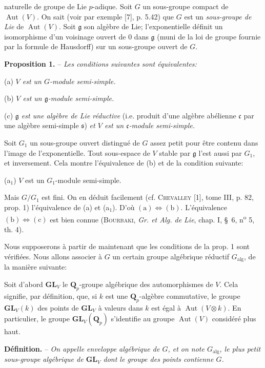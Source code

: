 naturelle de groupe de Lie $p$-adique. Soit $G$ un sous-groupe compact de $\operatorname{Aut}(V)$. On sait (voir par exemple [7], p. 5.42) que $G$ est un \textit{sous-groupe de Lie} de $\operatorname{Aut}(V)$. Soit $\mathfrak g$ son algèbre de Lie; l'exponentielle définit un isomorphisme d'un voisinage ouvert de 0 dans $\mathfrak g$ (muni de la loi de groupe fournie par la formule de Hausdorff) sur un sous-groupe ouvert de $G$.

\textbf{Proposition 1.} -- \textit{Les conditions suivantes sont équivalentes:}

(a) \textit{$V$ est un $G$-module semi-simple.}

(b) \textit{$V$ est un $\mathfrak g$-module semi-simple.}

(c) \textit{$\mathfrak g$ est une algèbre de Lie réductive} (i.e. produit d'une algèbre abélienne $\mathfrak c$ par une algèbre semi-simple $\mathfrak s$) \textit{et $V$ est un $\mathfrak c$-module semi-simple.}

Soit $G_1$ un sous-groupe ouvert distingué de $G$ assez petit pour être contenu dans l'image de l'exponentielle. Tout sous-espace de $V$ stable par $\mathfrak g$ l'est aussi par $G_1$, et inversement. Cela montre l'équivalence de (b) et de la condition suivante:

(a$_1$) $V$ est un $G_1$-module semi-simple.

Mais $G/G_1$ est fini. On en déduit facilement (cf. \textsc{Chevalley} [1], tome III, p. 82, prop. 1) l'équivalence de (a) et (a$_1$). D'où $(\mathrm a)\Leftrightarrow(\mathrm b)$. L'équivalence $(\mathrm b)\Leftrightarrow(\mathrm c)$ est bien connue (\textsc{Bourbaki}, \textit{Gr. et Alg. de Lie}, chap. I, \S\ 6, n\textsuperscript{o} 5, th. 4).

Nous supposerons à partir de maintenant que les conditions de la prop. 1 sont vérifiées. Nous allons associer à $G$ un certain groupe algébrique réductif $G_{\mathrm{alg}}$, de la manière suivante:

Soit d'abord $\mathbf{GL}_V$ le $\mathbf Q_p$-groupe algébrique des automorphismes de $V$. Cela signifie, par définition, que, si $k$ est une $\mathbf Q_p$-algèbre commutative, le groupe $\mathbf{GL}_V(k)$ des points de $\mathbf{GL}_V$ à valeurs dans $k$ est égal à $\operatorname{Aut}(V\otimes k)$. En particulier, le groupe $\mathbf{GL}_V(\mathbf Q_p)$ s'identifie au groupe $\operatorname{Aut}(V)$ considéré plus haut.

\textbf{Définition.} -- \textit{On appelle enveloppe algébrique de $G$, et on note $G_{\mathrm{alg}}$, le plus petit sous-groupe algébrique de $\mathbf{GL}_V$ dont le groupe des points contienne $G$.}

